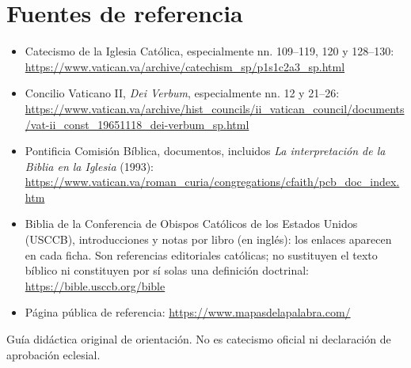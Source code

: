 \documentclass[11pt]{article}
\begin{document}
\section{Fuentes de referencia}
\begin{itemize}[leftmargin=1.2em]
\item Catecismo de la Iglesia Católica, especialmente nn. 109--119, 120 y 128--130: \url{https://www.vatican.va/archive/catechism_sp/p1s1c2a3_sp.html}
\item Concilio Vaticano II, \textit{Dei Verbum}, especialmente nn. 12 y 21--26: \url{https://www.vatican.va/archive/hist_councils/ii_vatican_council/documents/vat-ii_const_19651118_dei-verbum_sp.html}
\item Pontificia Comisión Bíblica, documentos, incluidos \textit{La interpretación de la Biblia en la Iglesia} (1993): \url{https://www.vatican.va/roman_curia/congregations/cfaith/pcb_doc_index.htm}
\item Biblia de la Conferencia de Obispos Católicos de los Estados Unidos (USCCB), introducciones y notas por libro (en inglés): los enlaces aparecen en cada ficha. Son referencias editoriales católicas; no sustituyen el texto bíblico ni constituyen por sí solas una definición doctrinal: \url{https://bible.usccb.org/bible}
\item Página pública de referencia: \url{https://www.mapasdelapalabra.com/}
\end{itemize}
\vfill
\begin{center}\small Guía didáctica original de orientación. No es catecismo oficial ni declaración de aprobación eclesial.\end{center}
\end{document}
